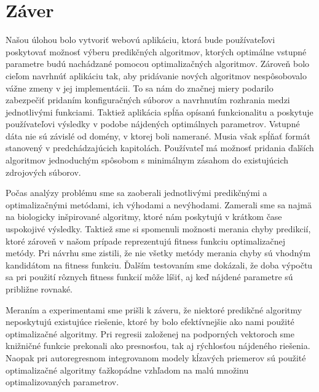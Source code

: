 \documentclass[a4paper,slovak,12pt,appendix]{article}
\begin{document}
\section{Záver}
\label{conclusion}
Našou úlohou bolo vytvoriť webovú aplikáciu, ktorá bude používateľovi poskytovať
možnosť výberu predikčných algoritmov, ktorých optimálne vstupné parametre budú
nachádzané pomocou optimalizačných algoritmov. Zároveň bolo cieľom navrhnúť
aplikáciu tak, aby pridávanie nových algoritmov nespôsobovalo vážne zmeny v jej
implementácii. To sa nám do značnej miery podarilo zabezpečiť pridaním
konfiguračných súborov a navrhnutím rozhrania medzi jednotlivými funkciami.
Taktiež aplikácia spĺňa opísanú funkcionalitu a poskytuje používateľovi
výsledky v podobe nájdených optimálnych parametrov. Vstupné dáta nie sú závislé
od domény, v ktorej boli namerané. Musia však spĺňať formát stanovený v predchádzajúcich
kapitolách. Používateľ má možnosť pridania ďalších algoritmov jednoduchým
spôsobom s minimálnym zásahom do existujúcich zdrojových súborov.

Počas analýzy problému sme sa zaoberali jednotlivými predikčnými
a optimalizačnými metódami, ich výhodami a nevýhodami. Zamerali sme sa najmä na
biologicky inšpirované algoritmy, ktoré nám poskytujú v krátkom čase uspokojivé
výsledky. Taktiež sme si spomenuli možnosti merania chyby predikcií, ktoré
zároveň v našom prípade reprezentujú fitness funkciu optimalizačnej metódy.
Pri návrhu sme zistili, že nie všetky metódy merania chyby sú vhodným kandidátom
na fitness funkciu. Ďalším testovaním sme dokázali, že doba výpočtu sa pri
použití rôznych fitness funkcií môže líšiť, aj keď nájdené parametre sú približne
rovnaké.

Meraním a experimentami sme prišli k záveru, že niektoré predikčné algoritmy
neposkytujú existujúce riešenie, ktoré by bolo efektívnejšie ako nami použité
optimalizačné algoritmy. Pri regresii založenej na podporných vektoroch sme
knižničné funkcie prekonali ako presnosťou, tak aj rýchlosťou nájdeného riešenia.
Naopak pri autoregresnom integrovanom modely kĺzavých priemerov sú použité
optimalizačné algoritmy ťažkopádne vzhľadom na malú množinu optimalizovaných
parametrov.


\newpage


\end{document}
